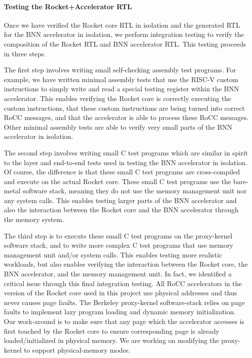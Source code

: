 \paragraph{Testing the Rocket+Accelerator RTL}
Once we have verified the Rocket core RTL in isolation and the generated
RTL for the BNN accelerator in isolation, we perform integration testing
to verify the composition of the Rocket RTL and BNN accelerator RTL. This
testing proceeds in three steps.

The first step involves writing small self-checking assembly test
programs. For example, we have written minimal assembly tests that use
the RISC-V custom instructions to simply write and read a special testing
register within the BNN accelerator. This enables verifying the Rocket
core is correctly executing the custom instructions, that these custom
instructions are being turned into correct RoCC messages, and that the
accelerator is able to process these RoCC messages. Other minimal
assembly tests are able to verify very small parts of the BNN accelerator
in isolation.

The second step involves writing small C test programs which are similar
in spirit to the layer and end-to-end tests used in testing the BNN
accelerator in isolation. Of course, the difference is that these small C
test programs are cross-compiled and execute on the actual Rocket core.
These small C test programs use the bare-metal software stack, meaning
they do not use the memory management unit nor any system calls. This
enables testing larger parts of the BNN accelerator and also the
interaction between the Rocket core and the BNN accelerator through the
memory system.

The third step is to execute these small C test programs on the
proxy-kernel software stack, and to write more complex C test programs
that use memory management unit and/or system calls. This enables testing
more realistic workloads, but also enables verifying the interaction
between the Rocket core, the BNN accelerator, and the memory management
unit. In fact, we identified a critical issue through this final
integration testing. All RoCC accelerators in the version of the Rocket
core used in this project use physical addresses and thus never causes
page faults. The Berkeley proxy-kernel software-stack relies on
page faults to implement lazy program loading and dynamic memory
initialization. Our work-around is to make sure that any page which the
accelerator accesses is first touched by the Rocket core to ensure
corresponding page is already loaded/initialized in physical memory. We are working on modifying the proxy-kernel to support physical-memory modes.

